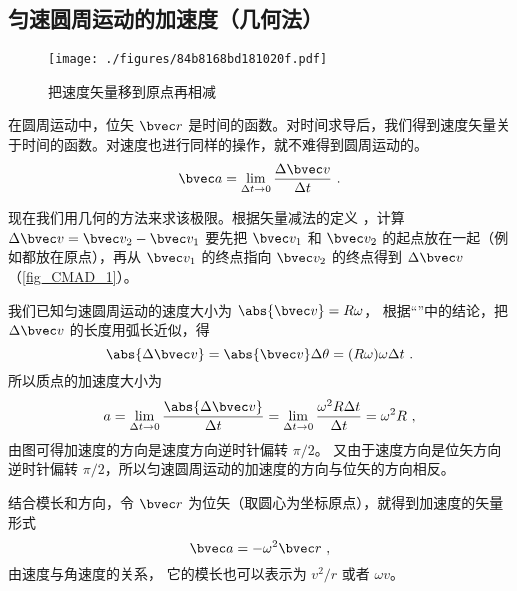 

\subsection{匀速圆周运动的加速度（几何法）}

\begin{figure}[ht]
\centering
\texttt{[image: ./figures/84b8168bd181020f.pdf]}
\caption{把速度矢量移到原点再相减}\label{fig_CMAD_1}
\end{figure}

在圆周运动中，位矢 $\bvec r$ 是时间的函数。对时间求导后，我们得到速度矢量关于时间的函数。对速度也进行同样的操作，就不难得到圆周运动的。
\begin{equation}
\bvec a = \lim_{\Delta t \to 0} \frac{\Delta \bvec v}{\Delta t}~.
\end{equation}

现在我们用几何的方法来求该极限。根据矢量减法的定义%
，计算 $\Delta \bvec v = \bvec v_2 - \bvec v_1$ 要先把 $\bvec v_1$ 和 $\bvec v_2$ 的起点放在一起（例如都放在原点），再从 $\bvec v_1$ 的终点指向 $\bvec v_2$ 的终点得到 $\Delta \bvec v$ （\autoref{fig_CMAD_1}）。 

我们已知匀速圆周运动的速度大小为 $\abs{\bvec v} = R\omega$， 根据“”中的结论，把 $\Delta\bvec v$ 的长度用弧长近似，得
\begin{equation}
\abs{\Delta \bvec v} = \abs{\bvec v}\Delta \theta  = (R\omega)\omega \Delta t~.
\end{equation}
所以质点的加速度大小为
\begin{equation}
a =\lim_{\Delta t \to 0} \frac{\abs{\Delta \bvec v}}{\Delta t} =  \lim_{\Delta t \to 0} \frac{\omega ^2 R \Delta t}{\Delta t} = \omega ^2 R~,
\end{equation}
由图可得加速度的方向是速度方向逆时针偏转 $\pi/2$。 又由于速度方向是位矢方向逆时针偏转 $\pi/2$，所以匀速圆周运动的加速度的方向与位矢的方向相反。

结合模长和方向，令 $\bvec r$ 为位矢（取圆心为坐标原点），就得到加速度的矢量形式
\begin{equation}\label{eq_CMAD_4}
\bvec a =  - \omega ^2 \bvec r~,
\end{equation}
由速度与角速度的关系， %
它的模长也可以表示为 $v^2/r$ 或者 $\omega v$。

